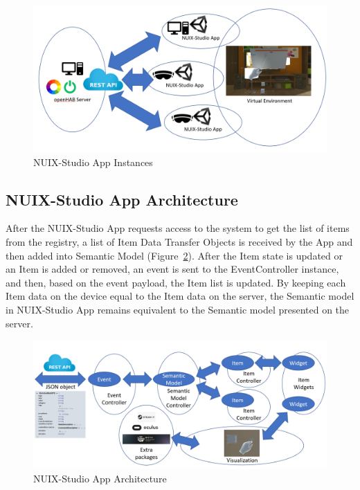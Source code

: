 \begin{figure}
  \centering
  \includegraphics[width=0.9\linewidth]{figures/AppInstances.png}
  \caption{NUIX-Studio App Instances}
  \label{fig:AppInstances-figure}
\end{figure}

\subsection{NUIX-Studio App Architecture}

After the NUIX-Studio App requests access to the system to get the list of items from the registry, a list of Item Data Transfer Objects is received by the App and then added into Semantic Model (Figure~\ref{fig:AppArchitecture-figure}). After the Item state is updated or an Item is added or removed, an event is sent to the EventController instance, and then, based on the event payload, the Item list is updated.  By keeping each Item data on the device equal to the Item data on the server, the Semantic model in NUIX-Studio App remains equivalent to the Semantic model presented on the server. 

\begin{figure}
  \centering
  \includegraphics[width=0.9\linewidth]{figures/AppArchitecture.png}
  \caption{NUIX-Studio App Architecture}
  \label{fig:AppArchitecture-figure}
\end{figure}

